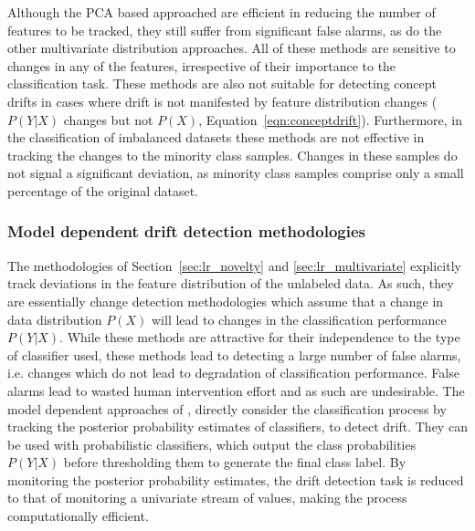 \documentclass[authoryear,3p,times,twocolumn]{elsarticle}
\begin{document}
Although the PCA based approached are efficient in reducing the number of features to be tracked, they still suffer from significant false alarms, as do the other multivariate distribution approaches. All of these methods are sensitive to changes in any of the features, irrespective of their importance to the classification task. These methods are also not suitable for detecting concept drifts in cases where drift is not manifested by feature distribution changes ($P(Y|X)$ changes but not $P(X)$, Equation~\ref{eqn:conceptdrift}). Furthermore, in the classification of imbalanced datasets these methods are not effective in tracking the changes to the minority class samples. Changes in these samples do not signal a significant deviation, as minority class samples comprise only a small percentage of the original dataset. 

\subsubsection{Model dependent drift detection methodologies}
\label{sec:lr_model}

The methodologies of Section~\ref{sec:lr_novelty} and \ref{sec:lr_multivariate} explicitly track deviations in the feature distribution of the unlabeled data. As such, they are essentially change detection methodologies which assume that a change in data distribution $P(X)$ will lead to changes in the classification performance $P(Y|X)$. While these methods are attractive for their independence to the type of classifier used, these methods lead to detecting a large number of false alarms, i.e. changes which do not lead to degradation of classification performance. False alarms lead to wasted human intervention effort and as such are undesirable. The model dependent approaches of  \citep{dries2009adaptive,lindstrom2013drift,dredze2010we,zliobaite2010change}, directly consider the classification process by tracking the posterior probability estimates of classifiers, to detect drift. They can be used with probabilistic classifiers, which output the class probabilities $P(Y|X)$ before thresholding them to generate the final class label. By monitoring the posterior probability estimates, the drift detection task is reduced to that of monitoring a univariate stream of values, making the process computationally efficient. 
\end{document}

